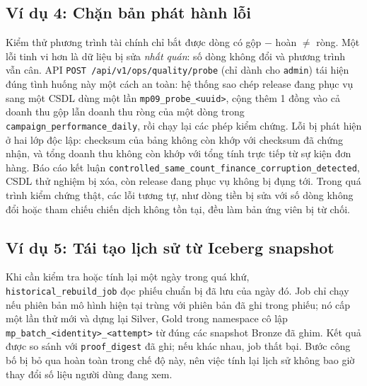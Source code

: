 \subsection{Ví dụ 4: Chặn bản phát hành lỗi}
\label{sec:c3-vi-du-4}
Kiểm thử phương trình tài chính chỉ bắt được dòng có gộp $-$ hoàn $\neq$ ròng. Một lỗi tinh vi hơn là dữ liệu bị sửa \emph{nhất quán}: số dòng không đổi và phương trình vẫn cân. API \texttt{POST /api/v1/ops/quality/probe} (chỉ dành cho \texttt{admin}) tái hiện đúng tình huống này một cách an toàn: hệ thống sao chép release đang phục vụ sang một CSDL dùng một lần \texttt{mp09\_probe\_<uuid>}, cộng thêm 1 đồng vào cả doanh thu gộp lẫn doanh thu ròng của một dòng trong \texttt{campaign\_performance\_daily}, rồi chạy lại các phép kiểm chứng. Lỗi bị phát hiện ở hai lớp độc lập: checksum của bảng không còn khớp với checksum đã chứng nhận, và tổng doanh thu không còn khớp với tổng tính trực tiếp từ sự kiện đơn hàng. Báo cáo kết luận \texttt{controlled\_same\_count\_finance\_corruption\_detected}, CSDL thử nghiệm bị xóa, còn release đang phục vụ không bị đụng tới. Trong quá trình kiểm chứng thật, các lỗi tương tự, như dòng tiền bị sửa với số dòng không đổi hoặc tham chiếu chiến dịch không tồn tại, đều làm bản ứng viên bị từ chối.

\subsection{Ví dụ 5: Tái tạo lịch sử từ Iceberg snapshot}
\label{sec:c3-vi-du-5}
Khi cần kiểm tra hoặc tính lại một ngày trong quá khứ, \texttt{historical\_rebuild\_job} đọc phiếu chuẩn bị đã lưu của ngày đó. Job chỉ chạy nếu phiên bản mô hình hiện tại trùng với phiên bản đã ghi trong phiếu; nó cấp một lần thử mới và dựng lại Silver, Gold trong namespace cô lập \texttt{mp\_batch\_<identity>\_<attempt>} từ đúng các snapshot Bronze đã ghim. Kết quả được so sánh với \texttt{proof\_digest} đã ghi; nếu khác nhau, job thất bại. Bước công bố bị bỏ qua hoàn toàn trong chế độ này, nên việc tính lại lịch sử không bao giờ thay đổi số liệu người dùng đang xem.

